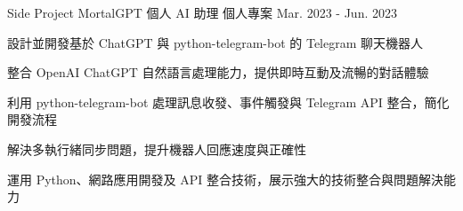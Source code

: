 \begin{cventries}
  \cventry
    {Side Project} %
    {MortalGPT 個人 AI 助理} %
    {個人專案} %
    {Mar. 2023 - Jun. 2023} %
    {
      \begin{cvitems} %
        \item{設計並開發基於 ChatGPT 與 python-telegram-bot 的 Telegram 聊天機器人}
        \item{整合 OpenAI ChatGPT 自然語言處理能力，提供即時互動及流暢的對話體驗}
        \item{利用 python-telegram-bot 處理訊息收發、事件觸發與 Telegram API 整合，簡化開發流程}
        \item{解決多執行緒同步問題，提升機器人回應速度與正確性}
        \item{運用 Python、網路應用開發及 API 整合技術，展示強大的技術整合與問題解決能力}
      \end{cvitems}
    }

\end{cventries}
